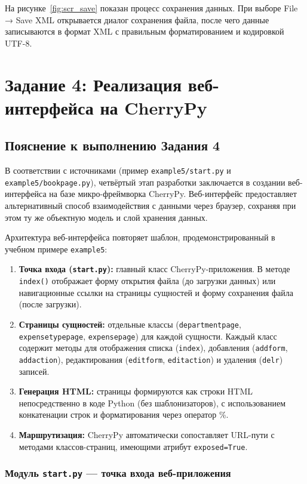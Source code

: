 \documentclass[14pt,a4paper]{extreport}
\begin{document}
На рисунке~\ref{fig:scr_save} показан процесс сохранения данных. При выборе File → Save XML открывается диалог сохранения файла, после чего данные записываются в формат XML с правильным форматированием и кодировкой UTF-8.

\chapter{Задание 4: Реализация веб-интерфейса на CherryPy}

\section{Пояснение к выполнению Задания 4}

В соответствии с источниками (пример \texttt{example5/start.py} и \texttt{example5/bookpage.py}), четвёртый этап разработки заключается в создании веб-интерфейса на базе микро-фреймворка CherryPy. Веб-интерфейс предоставляет альтернативный способ взаимодействия с данными через браузер, сохраняя при этом ту же объектную модель и слой хранения данных.

Архитектура веб-интерфейса повторяет шаблон, продемонстрированный в учебном примере \texttt{example5}:

\begin{enumerate}
    \item \textbf{Точка входа (\texttt{start.py}):} главный класс CherryPy-приложения. В методе \texttt{index()} отображает форму открытия файла (до загрузки данных) или навигационные ссылки на страницы сущностей и форму сохранения файла (после загрузки).
    \item \textbf{Страницы сущностей:} отдельные классы (\texttt{departmentpage}, \texttt{expensetypepage}, \texttt{expensepage}) для каждой сущности. Каждый класс содержит методы для отображения списка (\texttt{index}), добавления (\texttt{addform}, \texttt{addaction}), редактирования (\texttt{editform}, \texttt{editaction}) и удаления (\texttt{delr}) записей.
    \item \textbf{Генерация HTML:} страницы формируются как строки HTML непосредственно в коде Python (без шаблонизаторов), с использованием конкатенации строк и форматирования через оператор \%.
    \item \textbf{Маршрутизация:} CherryPy автоматически сопоставляет URL-пути с методами классов-страниц, имеющими атрибут \texttt{exposed=True}.
\end{enumerate}

\subsection{Модуль \texttt{start.py} --- точка входа веб-приложения}
\end{document}
